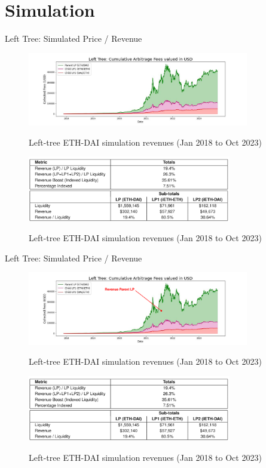 \documentclass[10pt,xcolor=svgnames]{beamer} %
\begin{document}
\section{Simulation}

\begin{frame}{Left Tree: Simulated Price / Revenue}

\begin{figure}[h!]
\includegraphics[width=3.8in]{img/arbitrage.png}
\label{fig:simulation}
\caption{Left-tree ETH-DAI simulation revenues (Jan 2018 to Oct 2023)}
\end{figure}


\begin{figure}[h!]
\includegraphics[width=3.5in]{img/sim_revenues.png}
\label{fig:simulation}
\caption{Left-tree ETH-DAI simulation revenues (Jan 2018 to Oct 2023)}
\end{figure}

\end{frame}

\begin{frame}{Left Tree: Simulated Price / Revenue}

\begin{figure}[h!]
\includegraphics[width=3.8in]{img/arbitrage1.png}
\label{fig:simulation}
\caption{Left-tree ETH-DAI simulation revenues (Jan 2018 to Oct 2023)}
\end{figure}


\begin{figure}[h!]
\includegraphics[width=3.5in]{img/sim_revenues.png}
\label{fig:simulation}
\caption{Left-tree ETH-DAI simulation revenues (Jan 2018 to Oct 2023)}
\end{figure}

\end{frame}
\end{document}
